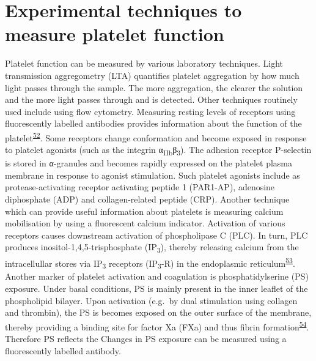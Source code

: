 \documentclass[11pt,twoside]{bristolthesis}
\begin{document}
\hypertarget{platelet-function-techniques}{%
\section{Experimental techniques to measure platelet function}\label{platelet-function-techniques}}

Platelet function can be measured by various laboratory techniques. Light transmission aggregometry (LTA) quantifies platelet aggregation by how much light passes through the sample. The more aggregation, the clearer the solution and the more light passes through and is detected. Other techniques routinely used include using flow cytometry. Measuring resting levels of receptors using fluorescently labelled antibodies provides information about the function of the platelet\textsuperscript{\protect\hyperlink{ref-Hu2017}{52}}. Some receptors change conformation and become exposed in response to platelet agonists (such as the integrin α\textsubscript{IIb}β\textsubscript{3}). The adhesion receptor P-selectin is stored in α-granules and becomes rapidly expressed on the platelet plasma membrane in response to agonist stimulation. Such platelet agonists include as protease-activating receptor activating peptide 1 (PAR1-AP), adenosine diphosphate (ADP) and collagen-related peptide (CRP). Another technique which can provide useful information about platelets is measuring calcium mobilisation by using a fluorescent calcium indicator. Activation of various receptors causes downstream activation of phospholipase C (PLC). In turn, PLC produces inositol-1,4,5-trisphosphate (IP\textsubscript{3}), thereby releasing calcium from the intracellullar stores via IP\textsubscript{3} receptors (IP\textsubscript{3}-R) in the endoplasmic reticulum\textsuperscript{\protect\hyperlink{ref-Varga-Szabo2009}{53}}. Another marker of platelet activation and coagulation is phosphatidylserine (PS) exposure. Under basal conditions, PS is mainly present in the inner leaflet of the phospholipid bilayer. Upon activation (e.g.~by dual stimulation using collagen and thrombin), the PS is becomes exposed on the outer surface of the membrane, thereby providing a binding site for factor Xa (FXa) and thus fibrin formation\textsuperscript{\protect\hyperlink{ref-Bevers1983}{54}}. Therefore PS reflects the Changes in PS exposure can be measured using a fluorescently labelled antibody.
\end{document}
